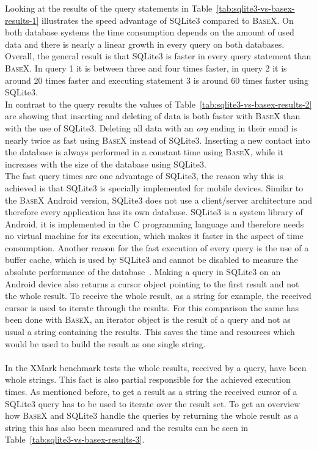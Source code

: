 Looking at the results of the query statements in Table~\ref{tab:sqlite3-vs-basex-results-1} illustrates the speed advantage of SQLite3 compared to \textsc{BaseX}.
On both database systems the time consumption depends on the amount of used data and there is nearly a linear growth in every query on both databases.
Overall, the general result is that SQLite3 is faster in every query statement than \textsc{BaseX}.
In query 1 it is between three and four times faster, in query 2 it is around 20 times faster and executing statement 3 is around 60 times faster using SQLite3.\\
In contrast to the query results the values of Table~\ref{tab:sqlite3-vs-basex-results-2} are showing that inserting and deleting of data is both faster with \textsc{BaseX} than with the use of SQLite3.
Deleting all data with an \textit{org} ending in their email is nearly twice as fast using \textsc{BaseX} instead of SQLite3.
Inserting a new contact into the database is always performed in a constant time using \textsc{BaseX}, while it increases with the size of the database using SQLite3.\\
The fast query times are one advantage of SQLite3, the reason why this is achieved is that SQLite3 is specially implemented for mobile devices.
Similar to the \textsc{BaseX} Android version, SQLite3 does not use a client/server architecture and therefore every application has its own database\cite{wei2012android}.
SQLite3 is a system library of Android, it is implemented in the C programming language and therefore needs no virtual machine for its execution, which makes it faster in the aspect of time consumption.
Another reason for the fast execution of every query is the use of a buffer cache, which is used by SQLite3 and cannot be disabled to measure the absolute performance of the database~\cite{kim2012androbench}.
Making a query in SQLite3 on an Android device also returns a cursor object pointing to the first result and not the whole result. 
To receive the whole result, as a string for example, the received cursor is used to iterate through the results.
For this comparison the same has been done with \textsc{BaseX}, an iterator object is the result of a query and not as usual a string containing the results.
This saves the time and resources which would be used to build the result as one single string.\\
\\
In the XMark benchmark tests the whole results, received by a query, have been whole strings.
This fact is also partial responsible for the achieved execution times.
As mentioned before, to get a result as a string the received cursor of a SQLite3 query has to be used to iterate over the result set.
To get an overview how \textsc{BaseX} and SQLite3 handle the queries by returning the whole result as a string this has also been measured and the results can be seen in Table~\ref{tab:sqlite3-vs-basex-results-3}.

